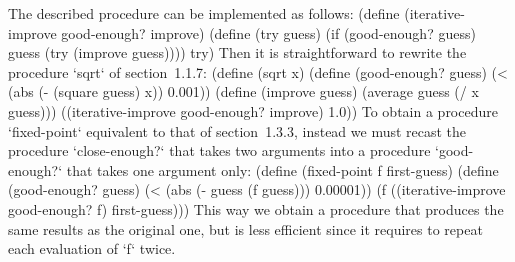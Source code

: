 The described procedure can be implemented as follows:
\begtt\scm
(define (iterative-improve good-enough? improve)
  (define (try guess)
    (if (good-enough? guess)
      guess
      (try (improve guess))))
  try)
\endtt
Then it is straightforward to rewrite the procedure `sqrt` of section~1.1.7:
\begtt\scm
(define (sqrt x)
  (define (good-enough? guess)
    (< (abs (- (square guess) x)) 0.001))
  (define (improve guess)
    (average guess (/ x guess)))
  ((iterative-improve good-enough? improve) 1.0))
\endtt
To obtain a procedure `fixed-point` equivalent to that of section~1.3.3, instead we must recast the procedure `close-enough?` that takes two arguments into a procedure `good-enough?` that takes one argument only:
\begtt\scm
(define (fixed-point f first-guess)
  (define (good-enough? guess)
    (< (abs (- guess (f guess))) 0.00001))
  (f ((iterative-improve good-enough? f) first-guess)))
\endtt
This way we obtain a procedure that produces the same results as the original one, but is less efficient since it requires to repeat each evaluation of `f` twice.
